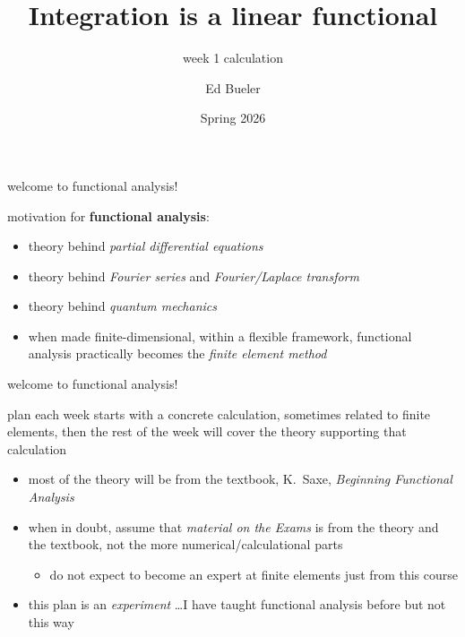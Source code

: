 \documentclass[10pt,
               svgnames,
               hyperref={colorlinks,citecolor=DeepPink4,linkcolor=FireBrick,urlcolor=Maroon},
               usepdftitle=false]{beamer}
\title{Integration is a linear functional}
\subtitle{week 1 calculation}
\author{Ed Bueler}
\institute[]{UAF Math 617 Functional Analysis}
\date{Spring 2026}
\begin{document}
\beamertemplatenavigationsymbolsempty

\begin{frame}
  \maketitle
\end{frame}


\begin{frame}{welcome to functional analysis!}

motivation for \textbf{functional analysis}:

\medskip
\begin{itemize}
\item theory behind \emph{partial differential equations}
\item theory behind \emph{Fourier series} and \emph{Fourier/Laplace transform}
\item theory behind \emph{quantum mechanics}
\item when made finite-dimensional, within a flexible framework, functional analysis practically becomes the \emph{finite element method}
\end{itemize}
\end{frame}


\begin{frame}{welcome to functional analysis!}

\begin{block}{plan}
each week starts with a concrete calculation, sometimes related to finite elements, then the rest of the week will cover the theory supporting that calculation
\end{block}

\begin{itemize}
\item most of the theory will be from the textbook, K.~Saxe, \emph{Beginning Functional Analysis}
\item when in doubt, assume that \emph{material on the Exams} is from the theory and the textbook, not the more numerical/calculational parts
    \begin{itemize}
    \item[$\circ$] do not expect to become an expert at finite elements just from this course
    \end{itemize}
\item this plan is an \emph{experiment} \dots I have taught functional analysis before but not this way
\end{itemize}
\end{frame}
\end{document}
